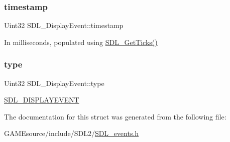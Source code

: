 \subsubsection{\texorpdfstring{timestamp}{timestamp}}
{\footnotesize\ttfamily Uint32 S\+D\+L\+\_\+\+Display\+Event\+::timestamp}

In milliseconds, populated using \mbox{\hyperlink{_s_d_l__timer_8h_a0b9bc71d6287e0ffafdc3419760fe2b3}{S\+D\+L\+\_\+\+Get\+Ticks()}} \mbox{\label{struct_s_d_l___display_event_a5f4993ce9c5289a2ac046ae7a6dff544}} 
\subsubsection{\texorpdfstring{type}{type}}
{\footnotesize\ttfamily Uint32 S\+D\+L\+\_\+\+Display\+Event\+::type}

\mbox{\hyperlink{_s_d_l__events_8h_a3b589e89be6b35c02e0dd34a55f3fccaa825818ce6265316146d7288601fd5974}{S\+D\+L\+\_\+\+D\+I\+S\+P\+L\+A\+Y\+E\+V\+E\+NT}} 

The documentation for this struct was generated from the following file\+:\begin{DoxyCompactItemize}
\item 
G\+A\+M\+Esource/include/\+S\+D\+L2/\mbox{\hyperlink{_s_d_l__events_8h}{S\+D\+L\+\_\+events.\+h}}\end{DoxyCompactItemize}
